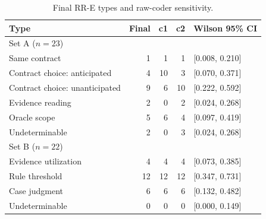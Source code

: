 \begin{table}[htbp]
\centering\small
\caption{Final RR-E types and raw-coder sensitivity.}
\label{tab:rrefinal}
\begin{tabular}{lrrrl}
\toprule
Type & Final & c1 & c2 & Wilson 95\% CI \\
\midrule
\multicolumn{5}{l}{Set A ($n=23$)} \\
Same contract & 1 & 1 & 1 & [0.008, 0.210] \\
Contract choice: anticipated & 4 & 10 & 3 & [0.070, 0.371] \\
Contract choice: unanticipated & 9 & 6 & 10 & [0.222, 0.592] \\
Evidence reading & 2 & 0 & 2 & [0.024, 0.268] \\
Oracle scope & 5 & 6 & 4 & [0.097, 0.419] \\
Undeterminable & 2 & 0 & 3 & [0.024, 0.268] \\
\multicolumn{5}{l}{Set B ($n=22$)} \\
Evidence utilization & 4 & 4 & 4 & [0.073, 0.385] \\
Rule threshold & 12 & 12 & 12 & [0.347, 0.731] \\
Case judgment & 6 & 6 & 6 & [0.132, 0.482] \\
Undeterminable & 0 & 0 & 0 & [0.000, 0.149] \\
\bottomrule
\end{tabular}
\end{table}

